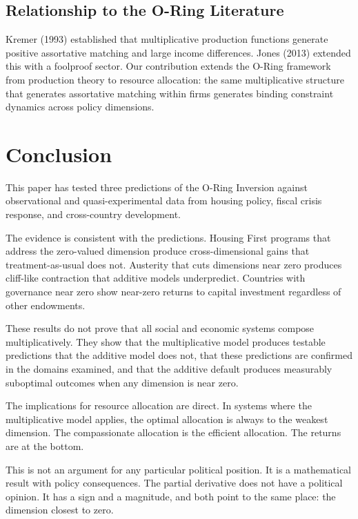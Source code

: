 \documentclass[12pt]{article}
\begin{document}
\subsection{Relationship to the O-Ring Literature}

Kremer (1993) established that multiplicative production functions generate positive assortative matching and large income differences. Jones (2013) extended this with a foolproof sector. Our contribution extends the O-Ring framework from production theory to resource allocation: the same multiplicative structure that generates assortative matching within firms generates binding constraint dynamics across policy dimensions.


\section{Conclusion}
\label{sec:conclusion}

This paper has tested three predictions of the O-Ring Inversion against observational and quasi-experimental data from housing policy, fiscal crisis response, and cross-country development.

The evidence is consistent with the predictions. Housing First programs that address the zero-valued dimension produce cross-dimensional gains that treatment-as-usual does not. Austerity that cuts dimensions near zero produces cliff-like contraction that additive models underpredict. Countries with governance near zero show near-zero returns to capital investment regardless of other endowments.

These results do not prove that all social and economic systems compose multiplicatively. They show that the multiplicative model produces testable predictions that the additive model does not, that these predictions are confirmed in the domains examined, and that the additive default produces measurably suboptimal outcomes when any dimension is near zero.

The implications for resource allocation are direct. In systems where the multiplicative model applies, the optimal allocation is always to the weakest dimension. The compassionate allocation is the efficient allocation. The returns are at the bottom.

This is not an argument for any particular political position. It is a mathematical result with policy consequences. The partial derivative does not have a political opinion. It has a sign and a magnitude, and both point to the same place: the dimension closest to zero.
\end{document}
